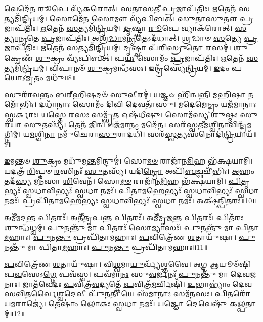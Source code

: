 𑌵𑍇𑌦𑍇᳴𑌨 \ul{𑌰𑍂}\-𑌪𑍇 𑌵𑍍𑌯᳴𑌕𑌰𑍋𑌤𑍍।
\-\ul{𑌸}\-\-\ul{𑌤𑌾}\-\-\ul{𑌸}\-𑌤𑍀 \ul{𑌪𑍍𑌰}\-𑌜𑌾\-𑌪᳴𑌤𑌿𑌃।
\-\ul{𑌋}\-𑌤𑍇𑌨᳴ \ul{𑌸}\-𑌤𑍍𑌯𑌮𑌿᳴\-\ul{𑌨𑍍𑌦𑍍𑌰𑌿}\-𑌯𑌮𑍍।
𑌸𑍋𑌮𑍇᳴\-\ul{𑌨} 𑌸𑍋\-\ul{𑌮𑍗} 𑌵𑍍𑌯᳴𑌪𑌿𑌬𑌤𑍍।
\-\ul{𑌸𑍁}\-\-\ul{𑌤𑌾}\-\-\ul{𑌸𑍁}\-𑌤𑍗 \ul{𑌪𑍍𑌰}\-𑌜𑌾\-𑌪᳴𑌤𑌿𑌃।
\-\ul{𑌋}\-𑌤𑍇𑌨᳴ \ul{𑌸}\-𑌤𑍍𑌯𑌮𑌿᳴\-\ul{𑌨𑍍𑌦𑍍𑌰𑌿}\-𑌯𑌮𑍍।
\-\ul{𑌦𑍃}\-𑌷𑍍𑌟𑍍𑌵𑌾 \ul{𑌰𑍂}\-𑌪𑍇 𑌵𑍍𑌯𑌾𑌕᳴𑌰𑍋𑌤𑍍।
\-\ul{𑌸}\-\-\ul{𑌤𑍍𑌯𑌾}\-\-\ul{𑌨𑍃}\-𑌤𑍇 \ul{𑌪𑍍𑌰}\-𑌜𑌾\-𑌪᳴𑌤𑌿𑌃।
𑌅𑌶𑍍𑌰᳴\-\ul{𑌦𑍍𑌧𑌾}\-𑌮\-\ul{𑌨𑍃}\-𑌤𑍇\-𑌽𑌦᳴𑌧𑌾𑌤𑍍।
\-\ul{𑌶𑍍𑌰}\-𑌦𑍍𑌧𑌾𑍞 \ul{𑌸}\-𑌤𑍍𑌯𑍇 \ul{𑌪𑍍𑌰}\-𑌜𑌾\-𑌪᳴𑌤𑌿𑌃।
\-\ul{𑌋}\-𑌤𑍇𑌨᳴ \ul{𑌸}\-𑌤𑍍𑌯𑌮𑌿᳴\-\ul{𑌨𑍍𑌦𑍍𑌰𑌿}\-𑌯𑌮𑍍।
\-\ul{𑌦𑍃}\-𑌷𑍍𑌟𑍍𑌵𑌾 𑌪᳴\-\ul{𑌰𑌿}\-𑌸𑍍𑌰𑍁\-\ul{𑌤𑍋} 𑌰𑌸𑌮𑍍॑।
\-\ul{𑌶𑍁}\-𑌕𑍍𑌰𑍇𑌣᳴ \ul{𑌶𑍁}\-𑌕𑍍𑌰𑌂 𑌵𑍍𑌯᳴𑌪𑌿𑌬𑌤𑍍।
𑌪\-\ul{𑌯𑌃} 𑌸𑍋𑌮𑌂᳴ \ul{𑌪𑍍𑌰}\-𑌜𑌾\-𑌪᳴𑌤𑌿𑌃।
\-\ul{𑌋}\-𑌤𑍇𑌨᳴ \ul{𑌸}\-𑌤𑍍𑌯𑌮𑌿᳴\-\ul{𑌨𑍍𑌦𑍍𑌰𑌿}\-𑌯𑌮𑍍।
𑌵𑌿𑌪𑌾𑌨𑍞᳴ \ul{𑌶𑍁}\-𑌕𑍍𑌰𑌮𑌨𑍍𑌧᳴𑌸𑌃।
𑌇𑌨𑍍𑌦𑍍𑌰᳴𑌸𑍍𑌯𑍇\-\ul{𑌨𑍍𑌦𑍍𑌰𑌿}\-𑌯𑌮𑍍।
\-\ul{𑌇}\-𑌦𑌂 𑌪\-\ul{𑌯𑍋}\-\-𑌽𑌮𑍃\-\ul{𑌤𑌂} 𑌮𑌧𑍁᳴॥8॥\anuvakamend[\-\ul{𑌅}\-𑌦𑍍𑌭𑍍𑌯𑌃 \ul{𑌕𑍍𑌷𑍀}\-𑌰𑌂 𑌵𑍍𑌯᳴𑌪𑌿\-\ul{𑌬}\-𑌜𑍍𑌜𑌨𑍍𑌮᳴\-\ul{𑌨}\-𑌰𑍍𑌤𑍇𑌨᳴ \ul{𑌸}\-𑌤𑍍𑌯𑌮𑌿᳴\-\ul{𑌨𑍍𑌦𑍍𑌰𑌿}\-𑌯𑍟 \ul{𑌶𑍍𑌰}\-𑌦𑍍𑌧𑌾𑍞 \ul{𑌸}\-𑌤𑍍𑌯𑍇 \ul{𑌪𑍍𑌰}\-𑌜𑌾𑌪᳴𑌤𑌿\-\ul{𑌰}\-𑌷𑍍𑌟𑍗 𑌚᳴]

𑌸𑍁𑌰𑌾᳴𑌵𑌨𑍍𑌤𑌂 𑌬𑌰𑍍‌\mbox{}\-\ul{𑌹𑌿}\-𑌷𑌦𑍞᳴ \ul{𑌸𑍁}\-𑌵𑍀𑌰𑌮𑍍॑।
\-\ul{𑌯}\-𑌜𑍍𑌞𑍞 𑌹𑌿᳴𑌨𑍍𑌵𑌨𑍍𑌤𑌿 𑌮\-\ul{𑌹𑌿}\-𑌷𑌾 𑌨𑌮𑍋᳴𑌭𑌿𑌃।
𑌦𑌧𑌾᳴\-\ul{𑌨𑌾𑌃} 𑌸𑍋𑌮𑌂᳴ \ul{𑌦𑌿}\-𑌵𑌿 \ul{𑌦𑍇}\-𑌵𑌤𑌾᳴𑌸𑍁।
𑌮\-\ul{𑌦𑍇}\-𑌮𑍇\-\ul{𑌨𑍍𑌦𑍍𑌰𑌂} 𑌯𑌜᳴𑌮𑌾𑌨𑌾𑌃 \ul{𑌸𑍍𑌵}\-𑌰𑍍𑌕𑌾𑌃।
𑌯\-\ul{𑌸𑍍𑌤𑍇} 𑌰\-\ul{𑌸𑌃} 𑌸𑌮𑍍𑌭𑍃᳴\-\ul{𑌤} 𑌓𑌷᳴𑌧𑍀𑌷𑍁।
𑌸𑍋𑌮᳴\-\ul{𑌸𑍍𑌯} 𑌶𑍁\-\ul{𑌷𑍍𑌮𑌃} 𑌸𑍁𑌰᳴𑌯𑌾 \ul{𑌸𑍁}\-𑌤𑌸𑍍𑌯᳴।
𑌤𑍇𑌨᳴ 𑌜𑌿\-\ul{𑌨𑍍𑌵} 𑌯𑌜᳴𑌮𑌾\-\ul{𑌨𑌂} 𑌮𑌦𑍇᳴𑌨।
𑌸𑌰᳴𑌸𑍍𑌵𑌤𑍀\-\ul{𑌮}\-𑌶𑍍𑌵𑌿\-\ul{𑌨𑌾}\-𑌵𑌿𑌨𑍍𑌦𑍍𑌰᳴\-\ul{𑌮}\-𑌗𑍍𑌨𑌿𑌮𑍍।
𑌯\-\ul{𑌮}\-𑌶𑍍𑌵𑌿\-\ul{𑌨𑌾} 𑌨𑌮𑍁᳴𑌚𑍇𑌰𑌾\-\ul{𑌸𑍁}\-𑌰𑌾𑌦𑌧𑌿᳴।
𑌸𑌰᳴\-\ul{𑌸𑍍𑌵}\-𑌤𑍍𑌯𑌸᳴𑌨𑍋𑌦𑌿\-\ul{𑌨𑍍𑌦𑍍𑌰𑌿}\-𑌯𑌾𑌯᳴॥9॥

\-\ul{𑌇}\-𑌮𑌨𑍍𑌤𑍞 \ul{𑌶𑍁}\-𑌕𑍍𑌰𑌂 𑌮𑌧𑍁᳴𑌮\-\ul{𑌨𑍍𑌤}\-𑌮𑌿𑌨𑍍𑌦𑍁𑌮𑍍॑।
𑌸𑍋\-\ul{𑌮}\-\-\ul{𑍞} 𑌰𑌾𑌜𑌾᳴𑌨\-\ul{𑌮𑌿}\-𑌹 𑌭᳴𑌕𑍍𑌷𑌯𑌾𑌮𑌿।
𑌯𑌦𑌤𑍍𑌰᳴ \ul{𑌰𑌿}\-𑌪𑍍𑌤𑍞 \ul{𑌰}\-𑌸𑌿𑌨𑌃᳴ \ul{𑌸𑍁}\-𑌤𑌸𑍍𑌯᳴।
𑌯𑌦𑌿\-\ul{𑌨𑍍𑌦𑍍𑌰𑍋} 𑌅𑌪𑌿᳴\-\ul{𑌬}\-𑌚𑍍𑌛𑌚𑍀᳴𑌭𑌿𑌃।
\-\ul{𑌅}\-𑌹𑌂 𑌤𑌦᳴\-\ul{𑌸𑍍𑌯} 𑌮𑌨᳴𑌸𑌾 \ul{𑌶𑌿}\-𑌵𑍇𑌨᳴।
𑌸𑍋\-\ul{𑌮}\-\-\ul{𑍞} 𑌰𑌾𑌜𑌾᳴𑌨\-\ul{𑌮𑌿}\-𑌹 𑌭᳴𑌕𑍍𑌷𑌯𑌾𑌮𑌿।
\-\ul{𑌪𑌿}\-𑌤𑍃𑌭𑍍𑌯𑌃᳴ 𑌸𑍍𑌵\-\ul{𑌧𑌾}\-𑌵𑌿𑌭𑍍𑌯𑌃᳴ \ul{𑌸𑍍𑌵}\-𑌧𑌾 𑌨𑌮𑌃᳴।
\-\ul{𑌪𑌿}\-\-\ul{𑌤𑌾}\-\-\ul{𑌮}\-𑌹𑍇𑌭𑍍𑌯𑌃᳴ 𑌸𑍍𑌵\-\ul{𑌧𑌾}\-𑌵𑌿𑌭𑍍𑌯𑌃᳴ \ul{𑌸𑍍𑌵}\-𑌧𑌾 𑌨𑌮𑌃᳴।
𑌪𑍍𑌰𑌪𑌿᳴𑌤𑌾𑌮𑌹𑍇𑌭𑍍𑌯𑌃 𑌸𑍍𑌵\-\ul{𑌧𑌾}\-𑌵𑌿𑌭𑍍𑌯𑌃᳴ \ul{𑌸𑍍𑌵}\-𑌧𑌾 𑌨𑌮𑌃᳴।
𑌅𑌕𑍍𑌷᳴\-\ul{𑌨𑍍𑌪𑌿}\-𑌤𑌰𑌃᳴॥10॥

𑌅𑌮𑍀᳴𑌮𑌦𑌨𑍍𑌤 \ul{𑌪𑌿}\-𑌤𑌰𑌃᳴।
𑌅𑌤𑍀᳴𑌤𑍃𑌪𑌨𑍍𑌤 \ul{𑌪𑌿}\-𑌤𑌰𑌃᳴।
𑌅𑌮𑍀᳴𑌮𑍃𑌜𑌨𑍍𑌤 \ul{𑌪𑌿}\-𑌤𑌰𑌃᳴।
𑌪𑌿𑌤᳴\-\ul{𑌰𑌃} 𑌶𑍁𑌨𑍍𑌧᳴𑌧𑍍𑌵𑌮𑍍।
\-\ul{𑌪𑍁}\-𑌨𑌨𑍍𑌤𑍁᳴ 𑌮𑌾 \ul{𑌪𑌿}\-𑌤𑌰𑌃᳴ \ul{𑌸𑍋}\-𑌮𑍍𑌯𑌾𑌸𑌃᳴।
\-\ul{𑌪𑍁}\-𑌨𑌨𑍍𑌤𑍁᳴ 𑌮𑌾 𑌪𑌿𑌤𑌾\-\ul{𑌮}\-𑌹𑌾𑌃।
\-\ul{𑌪𑍁}\-𑌨\-\ul{𑌨𑍍𑌤𑍁} 𑌪𑍍𑌰𑌪𑌿᳴𑌤𑌾𑌮𑌹𑌾𑌃।
\-\ul{𑌪}\-𑌵𑌿𑌤𑍍𑌰𑍇᳴𑌣 \ul{𑌶}\-𑌤𑌾𑌯𑍁᳴𑌷𑌾।
\-\ul{𑌪𑍁}\-𑌨𑌨𑍍𑌤𑍁᳴ 𑌮𑌾 𑌪𑌿𑌤𑌾\-\ul{𑌮}\-𑌹𑌾𑌃।
\-\ul{𑌪𑍁}\-𑌨\-\ul{𑌨𑍍𑌤𑍁} 𑌪𑍍𑌰𑌪𑌿᳴𑌤𑌾𑌮𑌹𑌾𑌃॥11॥

\-\ul{𑌪}\-𑌵𑌿𑌤𑍍𑌰𑍇᳴𑌣 \ul{𑌶}\-𑌤𑌾𑌯𑍁᳴𑌷𑌾।
𑌵𑌿\-\ul{𑌶𑍍𑌵}\-𑌮𑌾\-\ul{𑌯𑍁}\-𑌰𑍍𑌵𑍍𑌯᳴𑌶𑍍𑌞𑌵𑍈।
𑌅\-\ul{𑌗𑍍𑌨} 𑌆𑌯𑍂𑍞᳴𑌷𑌿 𑌪\-\ul{𑌵}\-𑌸𑍇\-𑌽\-\ul{𑌗𑍍𑌨𑍇} 𑌪𑌵᳴𑌸𑍍𑌵।
𑌪𑌵᳴𑌮𑌾\-\ul{𑌨𑌃} 𑌸𑍁\-\ul{𑌵}\-𑌰𑍍𑌜𑌨𑌃᳴ \ul{𑌪𑍁}\-𑌨𑌨𑍍𑌤𑍁᳴ 𑌮𑌾 𑌦𑍇𑌵\-\ul{𑌜}\-𑌨𑌾𑌃।
𑌜𑌾𑌤᳴𑌵𑍇𑌦𑌃 \ul{𑌪}\-𑌵𑌿𑌤𑍍𑌰᳴\-\ul{𑌵}\-𑌦𑍍𑌯𑌤𑍍𑌤𑍇᳴ \ul{𑌪}\-𑌵𑌿𑌤𑍍𑌰᳴\-\ul{𑌮}\-𑌰𑍍𑌚𑌿𑌷𑌿᳴।
\-\ul{𑌉}\-𑌭𑌾𑌭𑍍𑌯𑌾𑌂॑ 𑌦𑍇𑌵 𑌸𑌵𑌿𑌤𑌰𑍍𑌵𑍈𑌶𑍍𑌵\-\ul{𑌦𑍇}\-𑌵𑍀 𑌪𑍁᳴\-\ul{𑌨}\-𑌤𑍀।
𑌯𑍇 𑌸᳴\-\ul{𑌮𑌾}\-𑌨𑌾𑌃 𑌸𑌮᳴𑌨𑌸𑌃।
\-\ul{𑌪𑌿}\-𑌤𑌰𑍋᳴ 𑌯\-\ul{𑌮}\-𑌰𑌾𑌜𑍍𑌯𑍇॑।
𑌤𑍇𑌷𑌾𑌂॑ \ul{𑌲𑍋}\-𑌕𑌃 \ul{𑌸𑍍𑌵}\-𑌧𑌾 𑌨𑌮𑌃᳴।
\-\ul{𑌯}\-𑌜𑍍𑌞𑍋 \ul{𑌦𑍇}\-𑌵𑍇𑌷𑍁᳴ 𑌕𑌲𑍍𑌪𑌤𑌾𑌮𑍍॥12॥

